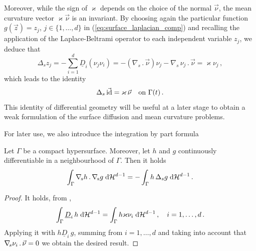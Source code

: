 Moreover, while the sign of $\varkappa$ depends on the choice of the normal
$\vec\nu$, the mean curvature vector $\varkappa \vec\nu$ is an invariant. By
choosing again the particular function $g(\vec z) = z_j$, $j \in \{ 1,
\hdots, d \}$ in (\ref{eq:surface_laplacian_comp}) and recalling the application
of the Laplace-Beltrami operator to each independent variable $z_j$, we deduce
that
\begin{equation}
\Delta_s z_j = - \sum_{i = 1}^d \underline{D}_i (\nu_j \nu_i) =
- (\nabla_s \,.\, \vec\nu) \nu_j - \nabla_s \, \nu_j \,.\, \vec\nu = \varkappa
\nu_j\, ,
\end{equation}
which leads to the identity
\begin{equation} \label{eq:LBop}
\Delta_s\, \vec {\rm id} = \varkappa\, \vec\nu \quad \mbox{on $\Gamma(t)$}\,.
\end{equation}
This identity of differential geometry will be useful at a later stage to
obtain a weak formulation of the surface diffusion and mean curvature problems.

For later use, we also introduce the integration by part formula
\begin{lemma}
Let $\Gamma$ be a compact hypersurface. Moreover, let $h$ and $g$ continuously
differentiable in a neighbourhood of $\Gamma$. Then it holds
\begin{equation}\label{eq:integration_by_part}
\int_\Gamma \nabla_{\!s} h\,.\,\nabla_{\!s} g \;{\rm d}{\cal H}^{d-1} =-\int_\Gamma h\,\Delta_s g\;{\rm d}{\cal H}^{d-1}\,.
\end{equation}

\begin{proof}
It holds, from \cite{GilbargT83},
\begin{equation*}
\int_\Gamma \underline{D}_i\,h \;{\rm d}{\cal H}^{d-1} = \int_\Gamma
h\varkappa\nu_i\;{\rm d}{\cal H}^{d-1}\,,
\quad i=1,\ldots,d\,.
\end{equation*}
Applying it with $h\underline{D}_i\,g$, summing from $i=1,\ldots,d$ and taking
into account that $\nabla_{\!s}\nu_i\,.\,\vec \nu=0$ we obtain the desired result.
\end{proof}

\end{lemma}

